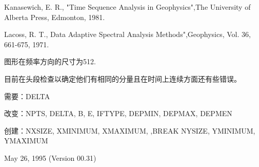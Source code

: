 Kanasewich, E. R., "Time Sequence Analysis in Geophysics",The University of Alberta Press, 	Edmonton, 1981.

Lacoss, R. T., Data Adaptive Spectral Analysis Methods",Geophysics, Vol. 36, 661-675, 1971.

图形在频率方向的尺寸为512.

目前在头段检查以确定他们有相同的分量且在时间上连续方面还有些错误。

需要：DELTA

改变：NPTS, DELTA, B, E, IFTYPE, DEPMIN, DEPMAX, DEPMEN

创建：NXSIZE, XMINIMUM, XMAXIMUM, ,BREAK NYSIZE, YMINIMUM, YMAXIMUM

May 26, 1995 (Version 00.31)

